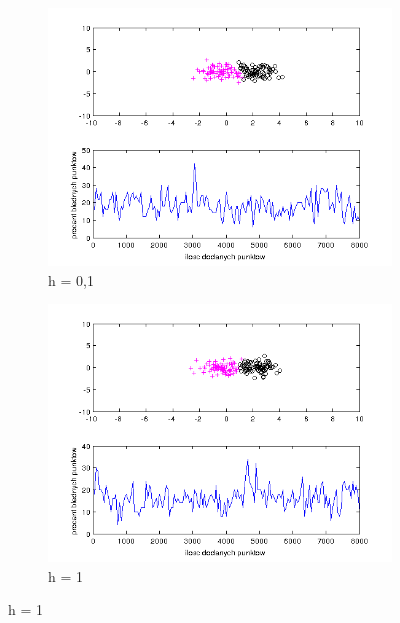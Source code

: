 \documentclass[10pt,a4paper]{article}
\begin{document}
\begin{figure}[H]
   \begin{subfigure}[b]{0.5\textwidth}
    \includegraphics[width=\textwidth]{test3_h0_1_18_5.png}
    \caption{h = 0,1}
  \end{subfigure}
  \hfill
  \begin{subfigure}[b]{0.5\textwidth}
    \includegraphics[width=\textwidth]{test3_h1_16_32.png}
    \caption{h = 1}
  \end{subfigure}
  

\end{figure}
\end{document}
